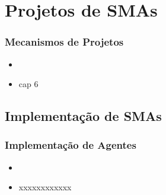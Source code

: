 



\section{Projetos de SMAs}
\begin{frame}

    \frametitle{Mecanismos de Projetos}
    \begin{itemize}
    \pause
      \item 
\pause
      \item cap 6
    
    \end{itemize}
\end{frame}




\subsection{Implementação de SMAs}
\begin{frame}

    \frametitle{Implementação de Agentes}
    \begin{itemize}
    \pause
      \item 
\pause
      \item xxxxxxxxxxxx
    
    \end{itemize}
\end{frame}


\begin{comment}
\section{Aprendizagem}
\begin{frame}

    \frametitle{Aprendizagem}
    \begin{itemize}
    \pause
      \item 
\pause
      \item cap 7
    
    \end{itemize}
\end{frame}
\end{comment}



